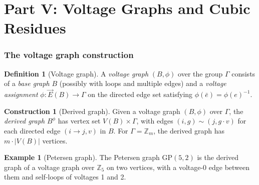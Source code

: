 \documentclass[11pt,a4paper]{article}
\theoremstyle{plain}
\theoremstyle{definition}
\newtheorem{definition}[theorem]{Definition}
\newtheorem{example}[theorem]{Example}
\newtheorem{construction}[theorem]{Construction}
\theoremstyle{remark}
\newcommand{\Z}{\mathbb{Z}}
\newcommand{\GP}{\mathrm{GP}}
\begin{document}
%
%

\newpage
\part*{Part V: Voltage Graphs and Cubic Residues}

\section{The voltage graph construction}

\begin{tcolorbox}[colback=green!8, colframe=green!8,
  boxrule=0pt, sharp corners]
\begin{definition}[Voltage graph]
A \emph{voltage graph} $(B, \phi)$ over the group $\Gamma$ consists of
a \emph{base graph} $B$ (possibly with loops and multiple edges) and
a \emph{voltage assignment} $\phi : \vec{E}(B) \to \Gamma$ on the
directed edge set satisfying $\phi(\bar{e}) = \phi(e)^{-1}$.
\end{definition}

\begin{construction}[Derived graph]
\label{con:derived}
Given a voltage graph $(B, \phi)$ over $\Gamma$, the \emph{derived graph}
$B^\phi$ has vertex set $V(B) \times \Gamma$, with edges
$(i, g) \sim (j, g \cdot v)$ for each directed edge $(i \to j, v)$ in $B$.
For $\Gamma = \Z_m$, the derived graph has $m \cdot |V(B)|$ vertices.
\end{construction}
\end{tcolorbox}

\begin{example}[Petersen graph]
The Petersen graph $\GP(5,2)$ is the derived graph of a voltage
graph over $\Z_5$ on two vertices, with a voltage-0 edge between them
and self-loops of voltages 1 and 2.
\end{example}
\end{document}
